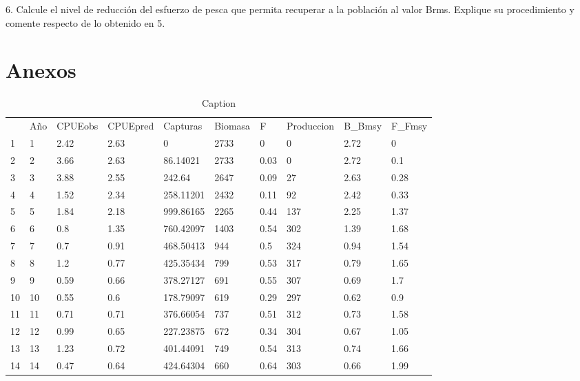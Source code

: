 \documentclass{uofa-eng-assignment}
\begin{document}
6. Calcule el nivel de reducción del esfuerzo de pesca que permita recuperar a la población al valor Brms. Explique su procedimiento y comente respecto de lo obtenido en 5.

\section*{Anexos}

\begin{table}[H]
 \caption{Caption}
\begin{tabular}{llllllllll}
   & Año & CPUEobs & CPUEpred & Capturas  & Biomasa & F    & Produccion & B\_Bmsy & F\_Fmsy \\
1  & 1   & 2.42    & 2.63     & 0         & 2733    & 0    & 0          & 2.72    & 0       \\
2  & 2   & 3.66    & 2.63     & 86.14021  & 2733    & 0.03 & 0          & 2.72    & 0.1     \\
3  & 3   & 3.88    & 2.55     & 242.64    & 2647    & 0.09 & 27         & 2.63    & 0.28    \\
4  & 4   & 1.52    & 2.34     & 258.11201 & 2432    & 0.11 & 92         & 2.42    & 0.33    \\
5  & 5   & 1.84    & 2.18     & 999.86165 & 2265    & 0.44 & 137        & 2.25    & 1.37    \\
6  & 6   & 0.8     & 1.35     & 760.42097 & 1403    & 0.54 & 302        & 1.39    & 1.68    \\
7  & 7   & 0.7     & 0.91     & 468.50413 & 944     & 0.5  & 324        & 0.94    & 1.54    \\
8  & 8   & 1.2     & 0.77     & 425.35434 & 799     & 0.53 & 317        & 0.79    & 1.65    \\
9  & 9   & 0.59    & 0.66     & 378.27127 & 691     & 0.55 & 307        & 0.69    & 1.7     \\
10 & 10  & 0.55    & 0.6      & 178.79097 & 619     & 0.29 & 297        & 0.62    & 0.9     \\
11 & 11  & 0.71    & 0.71     & 376.66054 & 737     & 0.51 & 312        & 0.73    & 1.58    \\
12 & 12  & 0.99    & 0.65     & 227.23875 & 672     & 0.34 & 304        & 0.67    & 1.05    \\
13 & 13  & 1.23    & 0.72     & 401.44091 & 749     & 0.54 & 313        & 0.74    & 1.66    \\
14 & 14  & 0.47    & 0.64     & 424.64304 & 660     & 0.64 & 303        & 0.66    & 1.99    \\

\end{tabular}
\end{table}
\end{document}
